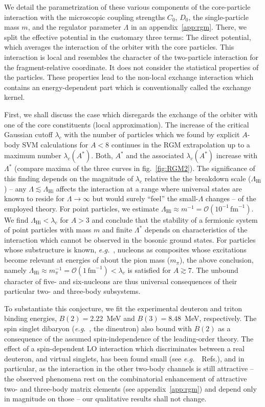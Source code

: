 \documentclass[preprint,12pt]{elsarticle}
\newcommand{\largescale}{\ensuremath{\Lambda_\text{Hi}}}
\newcommand{\lc}{\ensuremath{\lambda_c}}
\newcommand{\fm}{\ensuremath{\,\text{fm}^{-1}}}
\newcommand{\eg}{\textit{e.g.}~}
\newcommand{\figref}[1]{fig.~\ref{#1}}
\begin{document}
We detail the parametrization of these various components of the core-particle 
interaction with the
microscopic coupling strengths $C_0$, $D_0$, the single-particle mass $m$, and the
 regulator parameter $\Lambda$
in an appendix~\ref{app:rgm}.
There, we split the effective potential in the customary three terms:
The direct potential, which averages the interaction of the orbiter with the core 
particles. This interaction is
local and resembles the character of the two-particle interaction for the 
fragment-relative coordinate. It does not
consider the statistical properties of the particles.
These properties lead to the non-local exchange interaction which contains an
 energy-dependent part which
is conventionally called the exchange kernel.

First, we shall discuss the case which disregards the exchange of the orbiter with 
one of the core constituents (local approximation).
The increase of the critical Gaussian cutoff $\lc$ with the number of
particles which we found by explicit $A$-body SVM calculations for $A<8$
continues in the RGM extrapolation up to a maximum number $\lc(A^*)$.
Both, $A^*$ and the associated $\lc(A^*)$ increase with $\Lambda^*$
(compare maxima of the three curves in \figref{fig:RGM2}).
The significance of this finding depends on the magnitude of $\lc$
relative the the breakdown scale ($\largescale$) -- any 
$\Lambda\lesssim\largescale$ affects the interaction at a range where
universal states are known
to reside for $\Lambda\to\infty$ but would surely ``feel'' the small-$\Lambda$
changes -- of the employed theory. For point particles, we estimate
$\largescale\approx m^{-1}=\mathcal{O}(10^{-1}\fm)$.
We find $\largescale<\lc$ for $A>3$ and conclude that the
stability of a fermionic system of point particles with mass $m$ and
finite $\Lambda^*$ depends on characteristics of the interaction which cannot
be observed in the bosonic ground states.
For particles whose substructure is known, \eg, nucleons as composites whose
excitations become relevant at energies of about the pion mass ($m_\pi$),
the above conclusion, namely 
\mbox{$\largescale\approx m_\pi^{-1}=\mathcal{O}(1\fm)<\lc$}
is satisfied for $A\gtrsim7$. The unbound character of five- and six-nucleons
are thus universal consequences of their particular two- and three-body subsystems.

To substantiate this conjecture, we fit the experimental deuteron and triton
binding energies, $B(2)=2.22$~MeV and $B(3)=8.48$~MeV, respectively. 
The spin singlet dibaryon (\eg, the dineutron) also bound with $B(2)$ as a consequence
of the assumed spin-independence of the leading-order theory.
The effect of a spin-dependent LO interaction which discriminates between a real
deuteron, and virtual singlets, has been found small (see \eg~Refs.\cite{Kirscher:2015yda,Konig:2016utl}), and in
particular, as the interaction in the other two-body channels is still
attractive -- the observed phenomena rest on the combinatorial enhancement of
attractive two- and three-body matrix elements (see appendix~\ref{app:rgm}) and
depend only in magnitude on those -- our qualitative results shall not change.
\end{document}
